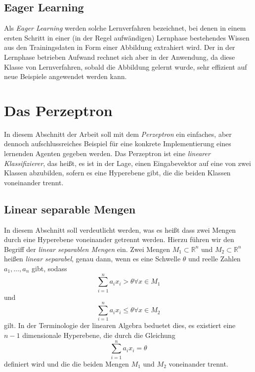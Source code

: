 \documentclass[fontsize=11pt]{scrartcl}
\begin{document}
            \subsection{Eager Learning}
                Als \emph{Eager Learning} werden solche Lernverfahren bezeichnet, bei denen in einem ersten Schritt in einer (in der Regel aufwändigen) Lernphase bestehendes Wissen aus den Trainingsdaten in Form einer Abbildung extrahiert wird.
                Der in der Lernphase betrieben Aufwand rechnet sich aber in der Anwendung, da diese Klasse von Lernverfahren, sobald die Abbildung gelernt wurde, sehr effizient auf neue Beispiele angewendet werden kann.\cite{ertel2016} 

        \section{Das Perzeptron}
            In diesem Abschnitt der Arbeit soll mit dem \emph{Perzeptron} ein einfaches, aber dennoch aufschlussreiches Beispiel für eine konkrete Implementierung eines lernenden Agenten gegeben werden.
            \newline
            Das Perzeptron ist eine \emph{linearer Klassifizierer}, das heißt, es ist in der Lage, einen Eingabevektor auf eine von zwei Klassen abzubilden, sofern es eine Hyperebene gibt, die die beiden Klassen voneinander trennt.

            \subsection{Linear separable Mengen}
                In diesem Abschnitt soll verdeutlicht werden, was es heißt dass zwei Mengen durch eine Hyperebene voneinander getrennt werden.
                Hierzu führen wir den Begriff der 
                \emph{linear separablen Mengen} ein.
                \newline
                Zwei Mengen $M_1 \subset \mathbb{R}^n$ und $M_2 \subset \mathbb{R}^n$ heißen \emph{linear separabel}, genau dann, wenn es eine Schwelle $\theta$ und reelle Zahlen $a_1,\dots,a_n$ gibt, sodass
                $$
                    \sum_{i=1}^n a_ix_i > \theta \forall x \in M_1$$
                und
                $$\sum_{i=1}^n a_ix_i \leq \theta \forall x \in M_2$$
                gilt.
                \newline
                In der Terminologie der linearen Algebra beduetet dies, es existiert eine $n-1$ dimensionale Hyperebene, die durch die Gleichung
                $$
                    \sum_{i=1}^n a_ix_i = \theta
                $$
                definiert wird und die die beiden Mengen $M_1$ und $M_2$ voneinander trennt.
\end{document}
